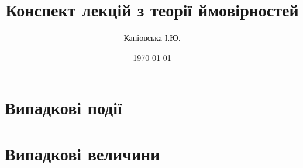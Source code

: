 \documentclass{report}
\author{Каніовська І.Ю.}
\title{Конспект лекцій з теорії ймовірностей}
\date{\today}
\begin{document}
 
    \maketitle
    \tableofcontents
    \chapter{Випадкові події}
        
        
        
        
    \chapter{Випадкові величини}
        
\end{document}
